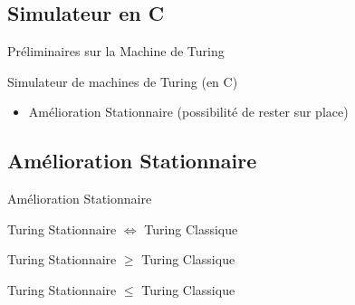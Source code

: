 \documentclass[12pt]{beamer}
\begin{document}
\subsection{Simulateur en C}
\begin{frame}{Préliminaires sur la Machine de Turing}
    
    Simulateur de machines de Turing (en C)
    \newline
    
    
    \begin{itemize}
    \setlength\itemsep{1em}
        \pause
        \item Amélioration Stationnaire (possibilité de rester sur place)
    \end{itemize}
\end{frame}

\subsection{Amélioration Stationnaire}
\begin{frame}{Amélioration Stationnaire}
    \begin{center}
        
    \Large Turing Stationnaire $\Longleftrightarrow$ Turing Classique

    \pause

    \vspace{1cm}

    \Large Turing Stationnaire $\geq$ Turing Classique

    \pause

    \vspace{1cm}

    \Large Turing Stationnaire $\leq$ Turing Classique
    
    \end{center}

    
\end{frame}
\end{document}
